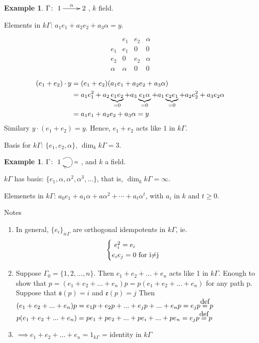 \documentclass{amsart}
\numberwithin{equation}{section}
\theoremstyle{definition}
\newtheorem{exam}[thm]{Example}
\newcommand{\G}{\Gamma}
\newcommand {\defeq}{\stackrel{\mathclap{\normalfont\mbox{def}}}{=}}
\begin{document}
\begin{exam}
$\Gamma\colon \xymatrix{1\ar[r]^\alpha & 2}$, $k$ field.  

Elements in $k\Gamma$:  $a_1e_1 + a_2e_2 + a_3\alpha = y$. 

\[\begin{array}{c||c|c|c}
      & e_1 & e_2 & \alpha \\ \hline\hline 
e_1 & e_1 &  0   &    0   \\ \hline
e_2 &   0   & e_2 &  \alpha \\ \hline
\alpha & \alpha & 0 & 0
\end{array}\]
\end{exam}
\begin{align}
(e_1 + e_2)\cdot y & = (e_1 + e_2)(a_1e_1 + a_2e_2 +
                     a_3\alpha)\notag\\
& = a_1e_1^2 + a_2\underbrace{e_1e_2}_{=0} + a_3\underbrace{e_1\alpha}_{=0} + a_1\underbrace{e_2e_1}_{=0} + a_2e_2^2 + a_3
  e_2\alpha\notag\\
& = a_1e_1 + a_2e_2 + a_3\alpha = y\notag
\end{align} 
Similary $y\cdot (e_1 + e_2) = y$.  Hence,  $e_1 + e_2$ acts like $1$
in $k\Gamma$. 

Basis for $k\Gamma$: $\{ e_1, e_2, \alpha\}$, $\dim_kk\Gamma = 3$.

\begin{exam}
$\Gamma\colon \xymatrix{1\ar@(ur,dr)[]^\alpha}$, and $k$ a field.

$k\Gamma$ has basis: $\{e_1, \alpha, \alpha^2, \alpha^3, \ldots\}$,
that is, $\dim_k k\Gamma = \infty$. 

Elemenets in $k\Gamma$: $a_0e_1 + a_1\alpha + a\alpha^2 + \cdots +
a_t\alpha^t$, with $a_i$ in $k$ and $t\geqslant 0$.  
\end{exam}


Notes
\begin{enumerate}
	\item  In general, $\{e_i\}_{i\epsilon\G}$ are orthogonal idempotents in $k\Gamma$, ie. 
	\[ \begin{cases}\text{\ $e_i^2 = e_i$}\notag\\
	\text{$e_ie_j = 0$ for i$\neq$j}\notag
	\end{cases}\]
	
	\item Suppose $\G_0 = \{1,2,...,n\}$. Then $e_1 + e_2 + ... + e_n$ acts like 1 in $k\G$. Enough to show that $p = (e_1 + e_2 + ... + e_n)p = p(e_1 + e_2 + ... + e_n)$ for any path p. Suppose that $\mathfrak{s}(p) = i$ and $\mathfrak{e}(p) = j$ Then
	\newline $(e_1 + e_2 + ... + e_n)p = e_1p + e_2p + ... + e_jp + ... + e_np = e_jp \defeq p$ \newline
	\newline $p(e_1 + e_2 + ... + e_n) = pe_1 + pe_2 + ... + pe_i + ... + pe_n = e_jp \defeq p$ \newline
	
	\item $\implies e_1 + e_2 + ... + e_n = 1_{k\G}$ = identity in $k\G$ 
\end{enumerate}
\end{document}
